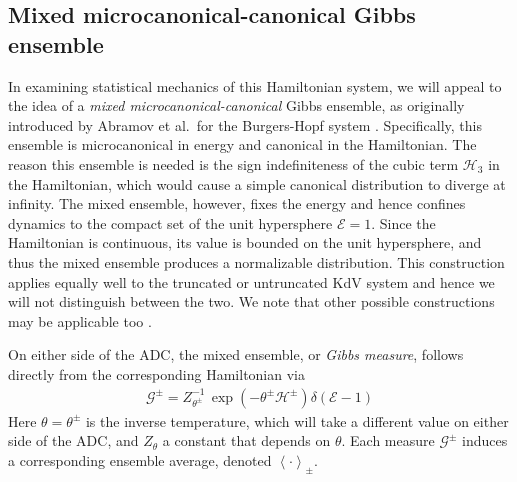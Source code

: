 \documentclass[11pt]{article}
\newcommand{\mean}[1]{\left< #1 \right>}
\newcommand{\CC}{{\mathbb{C}}}
\newcommand{\En}{\mathcal{E}}
\newcommand{\Ham}{\mathcal{H}}
\newcommand{\Hupdn}{\Ham^{\pm}}
\newcommand{\Hthree}{\Ham_{3}}
\newcommand{\Gibbs}{\mathcal{G}}
\newcommand{\Gupdn}{\Gibbs^{\pm}}
\newcommand{\thupdn}{\theta^{\pm}}
\newcommand{\Gz}{\Gibbs_0}
\newcommand{\tavg}[1]{\overline{#1}}
\begin{document}
\subsection{Mixed microcanonical-canonical Gibbs ensemble}

	In examining statistical mechanics of this Hamiltonian system, we will appeal to the idea of a {\em mixed microcanonical-canonical} Gibbs ensemble, as originally introduced by Abramov et al.~for the Burgers-Hopf system \cite{abramov2003}. Specifically, this ensemble is microcanonical in energy and canonical in the Hamiltonian. The reason this ensemble is needed is the sign indefiniteness of the cubic term $\Hthree$ in the Hamiltonian, which would cause a simple canonical distribution to diverge at infinity. The mixed ensemble, however, fixes the energy and hence confines dynamics to the compact set of the unit hypersphere $\En = 1$. Since the Hamiltonian is continuous, its value is bounded on the unit hypersphere, and thus the mixed ensemble produces a normalizable distribution. This construction applies equally well to the truncated or untruncated KdV system and hence we will not distinguish between the two. We note that other possible constructions may be applicable too \cite{kleeman2014nonequilibrium}.
	
	On either side of the ADC, the mixed ensemble, or {\em Gibbs measure}, follows directly from the corresponding Hamiltonian via
\begin{align}
\label{Gibbs}
\Gupdn = Z_{\thupdn}^{-1} \, \exp(-\thupdn \Hupdn) \delta(\En - 1)
\end{align}
Here $\theta = \thupdn$ is the inverse temperature, which will take a different value on either side of the ADC, and $Z_{\theta}$ a constant that depends on $\theta$. Each measure $\Gupdn$ induces a corresponding ensemble average, denoted $\mean{\cdot}_{\pm}$. 

\end{document}
